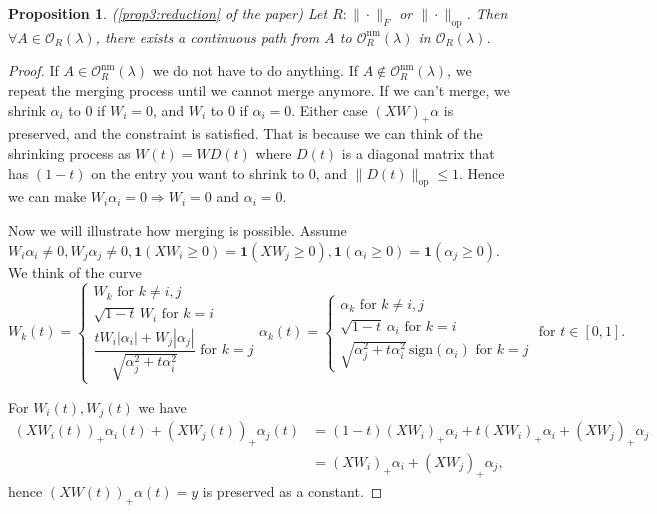 \documentclass{article}
\newtheorem{proposition}{Proposition}[section]
\newcommand{\op}{\mathrm{op}}
\newcommand{\nm}{\mathrm{nm}}      %
\begin{document}
\begin{proposition}
\label{Appxprop3:reduction} (\cref{prop3:reduction} of the paper)
Let $R: \|\cdot\|_F$ or $\|\cdot\|_{\op}$. Then $\forall A \in \mathcal{O}_R(\lambda)$, there exists a continuous path from $A$ to $\mathcal{O}_R^{\nm}(\lambda)$ in $\mathcal{O}_R(\lambda)$.
\end{proposition}

\begin{proof}
If $A \in \mathcal{O}_R^{\nm}(\lambda)$ we do not have to do anything. If $A \notin \mathcal{O}_R^{\nm}(\lambda)$, we repeat the merging process until we cannot merge anymore. If we can't merge, we shrink $\alpha_i$ to 0 if $W_i = 0$, and $W_i$ to 0 if $\alpha_i = 0$. Either case $(XW)_+ \alpha$ is preserved, and the constraint is satisfied. That is because we can think of the shrinking process as $W(t) = WD(t)$ where $D(t)$ is a diagonal matrix that has $(1-t)$ on the entry you want to shrink to 0, and $\|D(t)\|_{\op} \leq 1$. Hence we can make $W_i \alpha_i = 0 \Rightarrow W_i = 0$ and $\alpha_i = 0$.

Now we will illustrate how merging is possible. Assume $W_i \alpha_i \ne 0, W_j \alpha_j \ne 0, \mathbf{1}(XW_i \ge 0) = \mathbf{1}(XW_j \ge 0), \mathbf{1}(\alpha_i \ge 0) = \mathbf{1}(\alpha_j \ge 0)$. We think of the curve
\[ 
    W_k(t) = \begin{cases} 
    W_k \text{ for } k \ne i, j \\[4pt] 
    \sqrt{1-t}\, W_i \text{ for } k = i \\[4pt] 
    \dfrac{tW_i|\alpha_i|+W_j|\alpha_j|}{\sqrt{\alpha_j^2 + t\alpha_i^2}}\text{ for } k = j \end{cases} 
    \alpha_k(t) = \begin{cases} \alpha_k \text{ for } k \ne i, j \\[4pt]
    \sqrt{1-t}\, \alpha_i \text{ for } k = i \\[4pt] 
    \sqrt{\alpha_j^2 + t\alpha_i^2}\, \textrm{sign}(\alpha_i) \text{ for } k = j \end{cases} \text{ for } t \in [0, 1].
\]

For $W_i(t), W_j(t)$ we have
\begin{align*}
(XW_i(t))_{+}\alpha_i(t) + (XW_j(t))_{+}\alpha_j(t) &= (1-t)(XW_i)_{+}\alpha_i + t(XW_i)_{+}\alpha_i + (XW_j)_{+}\alpha_j\\
&= (XW_i)_{+}\alpha_i + (XW_j)_{+}\alpha_j,
\end{align*}
hence $(XW(t))_{+}\alpha(t) = y$ is preserved as a constant. 


\end{proof}
\end{document}
